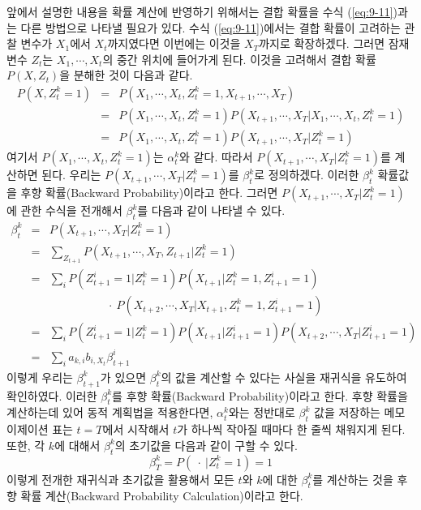 \documentclass[a4paper]{oblivoir}
\begin{document}
앞에서 설명한 내용을 확률 계산에 반영하기 위해서는 결합 확률을 수식 (\ref{eq:9-11})과는 다른 방법으로 나타낼 필요가 있다. 수식 (\ref{eq:9-11})에서는 결합 확률이 고려하는 관찰 변수가 $X_{1}$에서 $X_{t}$까지였다면 이번에는 이것을 $X_{T}$까지로 확장하겠다. 그러면 잠재 변수 $Z_{t}$는 $X_{1},\cdots,X_{t}$의 중간 위치에 들어가게 된다. 이것을 고려해서 결합 확률 $P(X,Z_{t})$을 분해한 것이 다음과 같다. 
\begin{eqnarray}
P(X,Z_{t}^{k}=1) & = & P(X_{1},\cdots,X_{t},Z_{t}^{k}=1,X_{t+1},\cdots,X_{T}) \nonumber \\
& = &  P(X_{1},\cdots,X_{t},Z_{t}^{k}=1)P(X_{t+1},\cdots,X_{T}|X_{1},\cdots,X_{t},Z_{t}^{k}=1) \nonumber \\
& = & P(X_{1},\cdots,X_{t},Z_{t}^{k}=1)P(X_{t+1},\cdots,X_{T}|Z_{t}^{k}=1) \label{eq:9-16}
\end{eqnarray}
여기서 $P(X_{1},\cdots,X_{t},Z_{t}^{k}=1)$는 $\alpha_{t}^{k}$와 같다. 따라서 $P(X_{t+1},\cdots,X_{T}|Z_{t}^{k}=1)$를 계산하면 된다. 우리는 $P(X_{t+1},\cdots,X_{T}|Z_{t}^{k}=1)$를 $\beta_{t}^{k}$로 정의하겠다. 이러한 $\beta_{t}^{k}$ 확률값을 후향 확률(Backward Probability)이라고 한다. 그러면 $P(X_{t+1},\cdots,X_{T}|Z_{t}^{k}=1)$에 관한 수식을 전개해서 $\beta_{t}^{k}$를 다음과 같이 나타낼 수 있다.
\begin{eqnarray}
\beta_{t}^{k} & = & P(X_{t+1},\cdots,X_{T}|Z_{t}^{k}=1) \nonumber \\
& = & \sum_{Z_{t+1}} P(X_{t+1},\cdots,X_{T}, Z_{t+1}|Z_{t}^{k}=1) \nonumber \\ 
& = & \sum_{i} P(Z_{t+1}^{i}=1|Z_{t}^{k}=1) P(X_{t+1}|Z_{t}^{k}=1, Z_{t+1}^{i}=1)  \nonumber \\
& & \ \ \ \ \ \ \ \ \ \ \ \ \ \ \ \ \ \ \ \ \ \ \ \cdot \ P(X_{t+2},\cdots,X_{T}|X_{t+1}, Z_{t}^{k}=1, Z_{t+1}^{i}=1) \nonumber \\
& = & \sum_{i} P(Z_{t+1}^{i}=1|Z_{t}^{k}=1) P(X_{t+1}|Z_{t+1}^{i}=1) P(X_{t+2},\cdots,X_{T}| Z_{t+1}^{i}=1) \nonumber \\
& = & \sum_{i} a_{k,i} b_{i,X_{t}} \beta_{t+1}^{i} \label{eq:9-17}
\end{eqnarray}
이렇게 우리는 $\beta_{t+1}^{k}$가 있으면 $\beta_{t}^{k}$의 값을 계산할 수 있다는 사실을 재귀식을 유도하여 확인하였다. 이러한 $\beta_{t}^{k}$를 후향 확률(Backward Probability)이라고 한다. 후향 확률을 계산하는데 있어 동적 계획법을 적용한다면, $\alpha_{t}^{k}$와는 정반대로 $\beta_{t}^{k}$ 값을 저장하는 메모이제이션 표는 $t=T$에서 시작해서 $t$가 하나씩 작아질 때마다 한 줄씩 채워지게 된다. 또한, 각 $k$에 대해서 $\beta_{t}^{k}$의 초기값을 다음과 같이 구할 수 있다. 
\begin{equation}
\beta_{T}^{k} = P(\ \cdot \ |Z_{t}^{k}=1) = 1
\label{eq:9-18}
\end{equation} 
이렇게 전개한 재귀식과 초기값을 활용해서 모든 $t$와 $k$에 대한 $\beta_{t}^{k}$를 계산하는 것을 후향 확률 계산(Backward Probability Calculation)이라고 한다. \\
\end{document}
